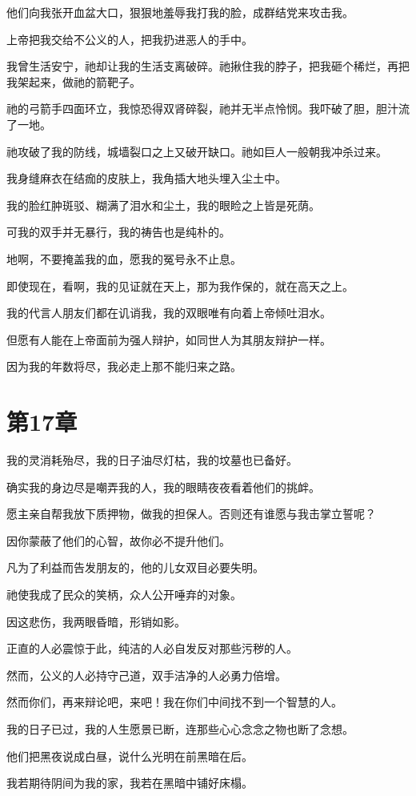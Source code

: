 \documentclass[12pt,oneside]{book}
\begin{document}
他们向我张开血盆大口，狠狠地羞辱我打我的脸，成群结党来攻击我。

上帝把我交给不公义的人，把我扔进恶人的手中。

我曾生活安宁，祂却让我的生活支离破碎。祂揪住我的脖子，把我砸个稀烂，再把我架起来，做祂的箭靶子。

祂的弓箭手四面环立，我惊恐得双肾碎裂，祂并无半点怜悯。我吓破了胆，胆汁流了一地。

祂攻破了我的防线，城墙裂口之上又破开缺口。祂如巨人一般朝我冲杀过来。

我身缝麻衣在结痂的皮肤上，我角插大地头埋入尘土中。

我的脸红肿斑驳、糊满了泪水和尘土，我的眼睑之上皆是死荫。

可我的双手并无暴行，我的祷告也是纯朴的。

地啊，不要掩盖我的血，愿我的冤号永不止息。

即使现在，看啊，我的见证就在天上，那为我作保的，就在高天之上。

我的代言人朋友们都在讥诮我，我的双眼唯有向着上帝倾吐泪水。

但愿有人能在上帝面前为强人辩护，如同世人为其朋友辩护一样。

因为我的年数将尽，我必走上那不能归来之路。


\chapter{第17章}
我的灵消耗殆尽，我的日子油尽灯枯，我的坟墓也已备好。

确实我的身边尽是嘲弄我的人，我的眼睛夜夜看着他们的挑衅。

愿主亲自帮我放下质押物，做我的担保人。否则还有谁愿与我击掌立誓呢？

因你蒙蔽了他们的心智，故你必不提升他们。

凡为了利益而告发朋友的，他的儿女双目必要失明。

祂使我成了民众的笑柄，众人公开唾弃的对象。

因这悲伤，我两眼昏暗，形销如影。

正直的人必震惊于此，纯洁的人必自发反对那些污秽的人。

然而，公义的人必持守己道，双手洁净的人必勇力倍增。

然而你们，再来辩论吧，来吧！我在你们中间找不到一个智慧的人。

我的日子已过，我的人生愿景已断，连那些心心念念之物也断了念想。

他们把黑夜说成白昼，说什么光明在前黑暗在后。

我若期待阴间为我的家，我若在黑暗中铺好床榻。
\end{document}
